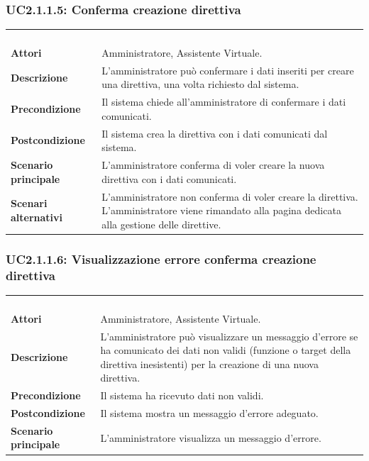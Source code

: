 \subsubsection{UC2.1.1.5: Conferma creazione direttiva}
\label{UC2.1.1.5}
\begin{longtable}{l|p{10cm}}
	\rowcolor[gray]{0.8} \multicolumn{2}{c}{} \\
	\rowcolor[gray]{0.8} \multicolumn{2}{c}{\textbf{UC2.1.1.5 - Conferma creazione direttiva}} \\
	\rowcolor[gray]{0.8} \multicolumn{2}{c}{} \\
	\hline
	&\\
	\textbf{Attori} & Amministratore, Assistente Virtuale.\\[7pt]
	\textbf{Descrizione} & L'amministratore può confermare i dati inseriti per creare una direttiva, una volta richiesto dal sistema.\\[7pt]
	\textbf{Precondizione} & Il sistema chiede all'amministratore di confermare i dati comunicati.\\[7pt]
	\textbf{Postcondizione} & Il sistema crea la direttiva con i dati comunicati dal sistema.\\[7pt]
	\textbf{Scenario principale} &L'amministratore conferma di voler creare la nuova direttiva con i dati comunicati.\\[7pt]
	\textbf{Scenari alternativi} & L'amministratore non conferma di voler creare la direttiva. L'amministratore viene rimandato alla pagina dedicata alla gestione delle direttive.\\[7pt]\hline
\end{longtable}

\subsubsection{UC2.1.1.6: Visualizzazione errore conferma creazione direttiva}
\label{UC2.1.1.6}
\begin{longtable}{l|p{10cm}}
	\rowcolor[gray]{0.8} \multicolumn{2}{c}{} \\
	\rowcolor[gray]{0.8} \multicolumn{2}{c}{\textbf{UC2.1.1.6 - Visualizzazione errore conferma creazione direttiva}} \\
	\rowcolor[gray]{0.8} \multicolumn{2}{c}{} \\
	\hline
	&\\
	\textbf{Attori} & Amministratore, Assistente Virtuale.\\[7pt]
	\textbf{Descrizione} & L'amministratore può visualizzare un messaggio d'errore se ha comunicato dei dati non validi (funzione o target della direttiva inesistenti) per la creazione di una nuova direttiva.
	\\[7pt]
	\textbf{Precondizione} & Il sistema ha ricevuto dati non validi.\\[7pt]
	\textbf{Postcondizione} & Il sistema mostra un messaggio d'errore adeguato.\\[7pt]
	\textbf{Scenario principale} &L'amministratore visualizza un messaggio d'errore.\\[7pt]\hline
\end{longtable}

